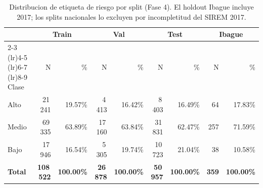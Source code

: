 \begin{table}[ht]
\centering
\small
\caption{Distribucion de etiqueta de riesgo por split (Fase 4). El holdout Ibague
incluye 2017; los splits nacionales lo excluyen por incompletitud del SIREM 2017.}
\label{tab:distribucion_clases_split}
\begin{tabular}{l rr rr rr rr}
\toprule
& \multicolumn{2}{c}{Train} & \multicolumn{2}{c}{Val} & \multicolumn{2}{c}{Test} & \multicolumn{2}{c}{Ibague} \\
\cmidrule(lr){2-3} \cmidrule(lr){4-5} \cmidrule(lr){6-7} \cmidrule(lr){8-9}
Clase & N & \% & N & \% & N & \% & N & \% \\
\midrule
Alto & 21\,241 & 19.57\% & 4\,413 & 16.42\% & 8\,403 & 16.49\% & 64 & 17.83\% \\
Medio & 69\,335 & 63.89\% & 17\,160 & 63.84\% & 31\,831 & 62.47\% & 257 & 71.59\% \\
Bajo & 17\,946 & 16.54\% & 5\,305 & 19.74\% & 10\,723 & 21.04\% & 38 & 10.58\% \\
\textbf{Total} & \textbf{108\,522} & \textbf{100.00\%} & \textbf{26\,878} & \textbf{100.00\%} & \textbf{50\,957} & \textbf{100.00\%} & \textbf{359} & \textbf{100.00\%} \\
\bottomrule
\end{tabular}
\end{table}
